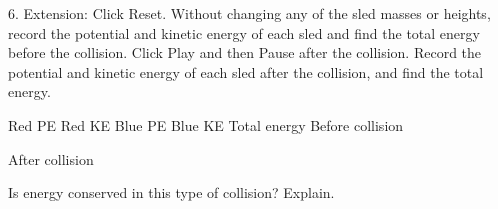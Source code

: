 	

               6. Extension: Click Reset. Without changing any of the sled masses or heights, record the potential and kinetic energy of each sled and find the total energy before the collision. Click Play and then Pause after the collision. Record the potential and kinetic energy of each sled after the collision, and find the total energy.




	Red PE
	Red KE
	Blue PE
	Blue KE
	Total energy
	Before collision
	

	

	

	

	

	After collision
	

	

	

	

	

	

Is energy conserved in this type of collision? Explain.